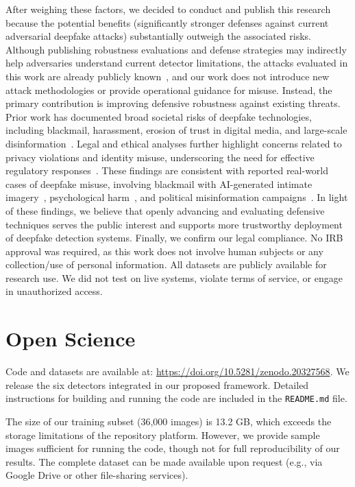 \documentclass[letterpaper,twocolumn,10pt]{article}
\begin{document}
After weighing these factors, we decided to conduct and publish this research because the potential benefits (significantly stronger defenses against current adversarial deepfake attacks) substantially outweigh the associated risks. Although publishing robustness evaluations and defense strategies may indirectly help adversaries understand current detector limitations, the attacks evaluated in this work are already publicly known~\cite{Sifat2024evolvingthreat}, and our work does not introduce new attack methodologies or provide operational guidance for misuse. Instead, the primary contribution is improving defensive robustness against existing threats. Prior work has documented broad societal risks of deepfake technologies, including blackmail, harassment, erosion of trust in digital media, and large-scale disinformation~\cite{alanazi2024examining,veerasamy2022rising}. Legal and ethical analyses further highlight concerns related to privacy violations and identity misuse, underscoring the need for effective regulatory responses~\cite{meskys2020regulating}. These findings are consistent with reported real-world cases of deepfake misuse, involving blackmail with AI-generated intimate imagery~\cite{alanazi2024examining}, psychological harm~\cite{alanazi2025unmasking}, and political misinformation campaigns~\cite{veerasamy2022rising}. In light of these findings, we believe that openly advancing and evaluating defensive techniques serves the public interest and supports more trustworthy deployment of deepfake detection systems.
Finally, we confirm our legal compliance. No IRB approval was required, as this work does not involve human subjects or any collection/use of personal information. All datasets are publicly available for research use. We did not test on live systems, violate terms of service, or engage in unauthorized access.




\section*{Open Science}
Code and datasets are available at: \url{https://doi.org/10.5281/zenodo.20327568}. 
We release the six detectors integrated in our proposed framework. Detailed instructions for building and running the code are included in the \texttt{README.md} file.

The size of our training subset (36,000 images) is 13.2 GB, which exceeds the storage limitations of the repository platform. However, we provide sample images sufficient for running the code, though not for full reproducibility of our results. The complete dataset can be made available upon request (e.g., via Google Drive or other file-sharing services).
\end{document}

